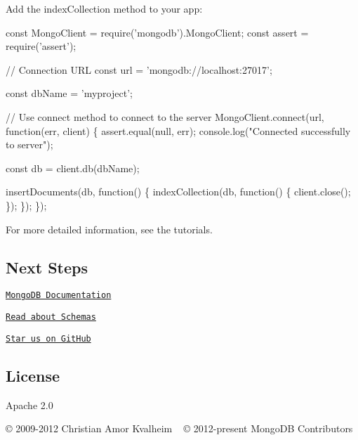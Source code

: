 Add the {\ttfamily index\+Collection} method to your app\+:


\begin{DoxyCode}
const MongoClient = require('mongodb').MongoClient;
const assert = require('assert');

// Connection URL
const url = 'mongodb://localhost:27017';

const dbName = 'myproject';

// Use connect method to connect to the server
MongoClient.connect(url, function(err, client) \{
  assert.equal(null, err);
  console.log("Connected successfully to server");

  const db = client.db(dbName);

  insertDocuments(db, function() \{
    indexCollection(db, function() \{
      client.close();
    \});
  \});
\});
\end{DoxyCode}


For more detailed information, see the tutorials.

\subsection*{Next Steps}


\begin{DoxyItemize}
\item \href{http://mongodb.org}{\tt Mongo\+DB Documentation}
\item \href{http://learnmongodbthehardway.com}{\tt Read about Schemas}
\item \href{https://github.com/mongodb/node-mongodb-native}{\tt Star us on Git\+Hub}
\end{DoxyItemize}

\subsection*{License}

Apache 2.0

© 2009-\/2012 Christian Amor Kvalheim ~\newline
© 2012-\/present Mongo\+DB Contributors 